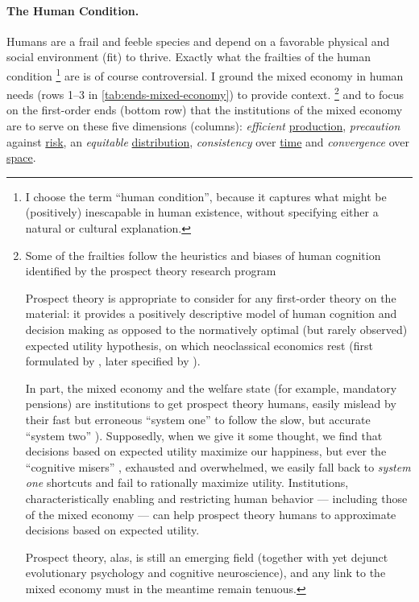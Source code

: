 \paragraph{The Human Condition.} %
Humans are a frail and feeble species and depend on a favorable physical and social environment (fit) to thrive.
Exactly what the frailties of the human condition
\footnote{\label{fn:human-condition}
	I choose the term ``human condition'', because it captures what might be (positively) inescapable in human existence, without specifying either a natural or cultural explanation.
}
are is of course controversial.
I ground the mixed economy in human needs (rows 1--3 in \autoref{tab:ends-mixed-economy}) to provide context.
\footnote{
	Some of the frailties follow the heuristics and biases of human cognition identified by the prospect theory research program \citep{KahnemanTversky1979,Kahneman2011
}

	Prospect theory is appropriate to consider for any first-order theory on the material:
it provides a positively descriptive model of human cognition and decision making as opposed to the normatively optimal (but rarely observed) expected utility hypothesis, on which neoclassical economics rest (first formulated by \citealt{Bernoulli1738}, later specified by \citealt{VonNeumannMorgenstern1944}).

	In part, the mixed economy and the welfare state (for example, mandatory pensions) are institutions to get prospect theory humans, easily mislead by their fast but erroneous ``system one'' to follow the slow, but accurate ``system two'' \citep{Kahneman2011}).
	Supposedly, when we give it some thought, we find that decisions based on expected utility \citep{Bernoulli1738} maximize our happiness, but ever the ``cognitive misers'' \citep{FiskeTaylor-1991-aa}, exhausted and overwhelmed, we easily fall back to \emph{system one} shortcuts and fail to rationally maximize utility.
	Institutions, characteristically enabling and restricting human behavior --- including those of the mixed economy --- can help prospect theory humans to approximate decisions based on expected utility.

	Prospect theory, alas, is still an emerging field (together with yet dejunct evolutionary psychology and cognitive neuroscience), and any link to the mixed economy must in the meantime remain tenuous.
}
and to focus on the first-order ends (bottom row) that the institutions of the mixed economy are to serve on these five dimensions (columns):
\emph{efficient} \hyperref[sec:production]{production}, \emph{precaution} against \hyperref[sec:risk]{risk}, an \emph{equitable} \hyperref[sec:distribution]{distribution}, \emph{consistency} over \hyperref[sec:time]{time} and \emph{convergence} over \hyperref[sec:space]{space}.

